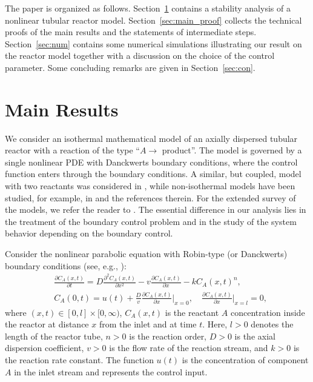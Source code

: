 \documentclass{mpi2015-cscpreprint}
\numberwithin{equation}{section}
\begin{document}
The paper is organized as follows. Section~\ref{sec:applications} contains a stability analysis of a nonlinear tubular reactor model. Section~\ref{sec:main_proof} collects the technical proofs of the main results and the statements of intermediate steps.
Section~\ref{sec:num} contains some numerical simulations illustrating our result on the reactor model together with a discussion on the choice of the control parameter. Some concluding remarks are given in 
Section~\ref{sec:con}.

\section{Main Results}\label{sec:applications}

We consider an isothermal mathematical model of an axially dispersed tubular reactor with a reaction of the type ``$A \to$ product''. The model is governed by a single nonlinear PDE with Danckwerts boundary conditions, where the control function enters through the boundary conditions. A similar, but coupled, model with two reactants was considered in \cite{AylAchLaa2007}, while non-isothermal models have been studied, for example, in \cite{HasWinDoc2020} and the references therein. For the extended survey of the models, we refer the reader to \cite{Doc2025}. The essential difference in our analysis lies in the treatment of the boundary control problem and in the study of the system behavior depending on the boundary control.

Consider the nonlinear parabolic equation with Robin-type (or Danckwerts) boundary conditions (see, e.g., \cite{NauMal1983,SH13}):
\begin{equation}\label{dftr}
\begin{aligned}
    &\frac{\partial C_A(x,t)}{\partial t}=D\frac{\partial^2C_A(x,t)}{\partial x^2} -v\frac{\partial C_A(x,t)}{\partial x}-kC_A(x,t)^n, 
\\ &C_A(0,t)=u(t)+\frac{D}{v}\frac{\partial C_A(x,t)}{\partial x}\Big|_{x=0}, \quad
\frac{\partial C_A(x,t)}{\partial x}\Big|_{x=l}=0,
\end{aligned}
\end{equation}
where $(x,t)\in[0,l]\times[0,\infty)$, $C_A(x,t)$ is the reactant $A$ concentration inside the reactor at distance $x$ from the inlet and at time $t$.
Here, $l>0$ denotes the length of the reactor tube, $n>0$ is the reaction order, $D>0$ is the axial dispersion coefficient, $v>0$ is the flow rate of the reaction stream, and $k>0$ is the reaction rate constant. The function $u(t)$  is the concentration of component $A$ in the inlet stream and represents the control input.
\end{document}
